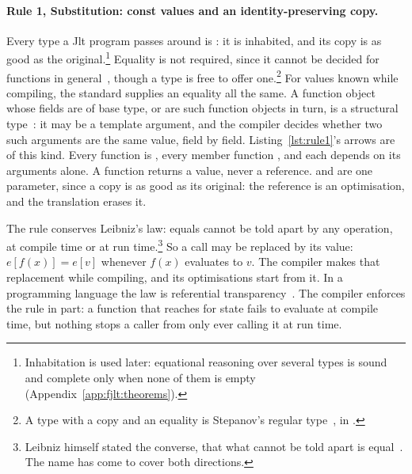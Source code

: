 \paragraph{Rule 1, Substitution: const values and an identity-preserving copy.}
\label{def:rule1}
Every type a Jlt program passes around is : it is inhabited, and its copy is as good as the original.\footnote{Inhabitation is used later: equational reasoning over several types is sound and complete only when none of them is empty (Appendix~\ref{app:fjlt:theorems}).}
Equality is not required, since it cannot be decided for functions in general~\cite{rice1953classes}, though a type is free to offer one.\footnote{A type with a copy and an equality is Stepanov's regular type~\cite{stepanov2009elements}, in  .}
For values known while compiling, the standard supplies an equality all the same.
A function object whose fields are of base type, or are such function objects in turn, is a structural type~\cite[{\texttt{temp.param}}]{cpp23standard}: it may be a template argument, and the compiler decides whether two such arguments are the same value, field by field.
Listing~\ref{lst:rule1}'s arrows are of this kind.
Every function is , every member function , and each depends on its arguments alone.
A function returns a value, never a reference.
 and  are one parameter, since a copy is as good as its original: the reference is an optimisation, and the translation erases it.

The rule conserves Leibniz's law: equals cannot be told apart by any operation, at compile time or at run time.\footnote{Leibniz himself stated the converse, that what cannot be told apart is equal~\cite{leibniz1686discours,leibniz1686discourse}.
The name has come to cover both directions.}
So a call may be replaced by its value: $e[f(x)] = e[v]$ whenever $f(x)$ evaluates to $v$.
The compiler makes that replacement while compiling, and its optimisations start from it.
In a programming language the law is referential transparency~\cite{strachey2000fundamental}.
The compiler enforces the rule in part: a  function that reaches for state fails to evaluate at compile time, but nothing stops a caller from only ever calling it at run time.

